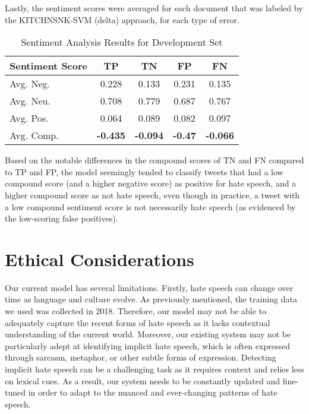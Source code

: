 \documentclass[11pt,a4paper]{article}
\begin{document}
Lastly, the sentiment scores were averaged for each document that was labeled by the KITCHNSNK-SVM (delta) approach, for each type of error.


\begin{table}[h]
\centering
\caption{Sentiment Analysis Results for Development Set}
\label{tab:errors}
\small
\begin{tabular}{lcccc}
\hline
Sentiment Score & TP & TN & FP & FN \\
\hline
Avg. Neg. & 0.228 & 0.133 & 0.231 & 0.135 \\
Avg. Neu. & 0.708 & 0.779 & 0.687 & 0.767 \\
Avg. Pos. & 0.064 & 0.089 & 0.082 & 0.097 \\
Avg. Comp. & \textbf{-0.435} & \textbf{-0.094} & \textbf{-0.47} & \textbf{-0.066} \\
 
\hline
\end{tabular}
\end{table}

Based on the notable differences in the compound scores of TN and FN compared to TP and FP, the model seemingly tended to classify tweets that had a low compound score (and a higher negative score) as positive for hate speech, and a higher compound score as not hate speech, even though in practice, a tweet with a low compound sentiment score is not necessarily hate speech (as evidenced by the low-scoring false positives).

\section{Ethical Considerations}
   Our current model has several limitations. Firstly, hate speech can change over time as language and culture evolve. As previously mentioned, the training data we used was collected in 2018. Therefore, our model may not be able to adequately capture the recent forms of hate speech as it lacks contextual understanding of the current world. Moreover, our existing system may not be particularly adept at identifying implicit hate speech, which is often expressed through sarcasm, metaphor, or other subtle forms of expression. Detecting implicit hate speech can be a challenging task as it requires context and relies less on lexical cues. As a result, our system needs to be constantly updated and fine-tuned in order to adapt to the nuanced and ever-changing patterns of hate speech.
 	 
\end{document}
